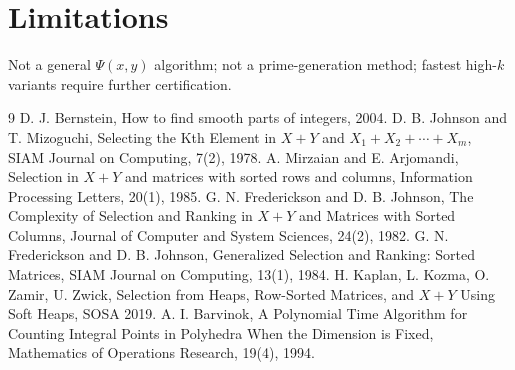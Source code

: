 \documentclass[11pt]{article}
\begin{document}
\section{Limitations}
Not a general $\Psi(x,y)$ algorithm; not a prime-generation method; fastest high-$k$ variants require further certification.


\begin{thebibliography}{9}
 D. J. Bernstein, How to find smooth parts of integers, 2004.
 D. B. Johnson and T. Mizoguchi, Selecting the Kth Element in $X+Y$ and $X_1+X_2+\cdots+X_m$, SIAM Journal on Computing, 7(2), 1978.
 A. Mirzaian and E. Arjomandi, Selection in $X+Y$ and matrices with sorted rows and columns, Information Processing Letters, 20(1), 1985.
 G. N. Frederickson and D. B. Johnson, The Complexity of Selection and Ranking in $X+Y$ and Matrices with Sorted Columns, Journal of Computer and System Sciences, 24(2), 1982.
 G. N. Frederickson and D. B. Johnson, Generalized Selection and Ranking: Sorted Matrices, SIAM Journal on Computing, 13(1), 1984.
 H. Kaplan, L. Kozma, O. Zamir, U. Zwick, Selection from Heaps, Row-Sorted Matrices, and $X+Y$ Using Soft Heaps, SOSA 2019.
 A. I. Barvinok, A Polynomial Time Algorithm for Counting Integral Points in Polyhedra When the Dimension is Fixed, Mathematics of Operations Research, 19(4), 1994.
\end{thebibliography}
\end{document}
